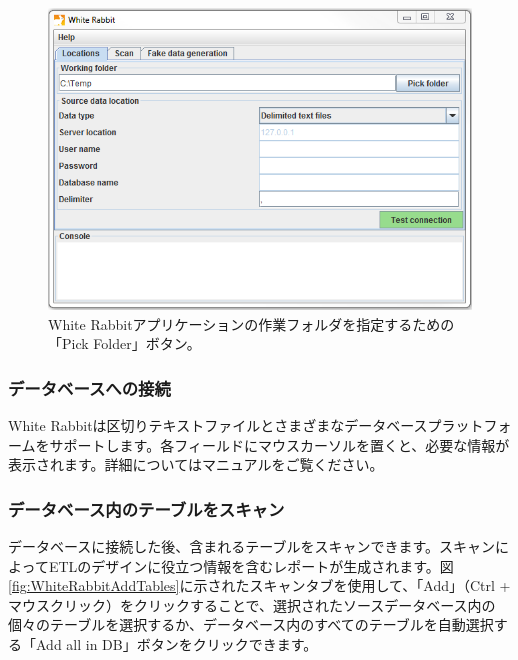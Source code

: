 \documentclass[
  11pt]{book}
\theoremstyle{definition}
\theoremstyle{definition}
\theoremstyle{definition}
\theoremstyle{definition}
\theoremstyle{remark}
\begin{document}
\begin{figure}

{\centering \includegraphics[width=1\linewidth]{images/ExtractTransformLoad/WhiteRabbitLocation} 

}

\caption{White Rabbitアプリケーションの作業フォルダを指定するための「Pick Folder」ボタン。}\label{fig:WhiteRabbitLocation}
\end{figure}

\subsubsection*{データベースへの接続}\label{ux30c7ux30fcux30bfux30d9ux30fcux30b9ux3078ux306eux63a5ux7d9a}

White Rabbitは区切りテキストファイルとさまざまなデータベースプラットフォームをサポートします。各フィールドにマウスカーソルを置くと、必要な情報が表示されます。詳細についてはマニュアルをご覧ください。

\subsubsection*{データベース内のテーブルをスキャン}\label{ux30c7ux30fcux30bfux30d9ux30fcux30b9ux5185ux306eux30c6ux30fcux30d6ux30ebux3092ux30b9ux30adux30e3ux30f3}

データベースに接続した後、含まれるテーブルをスキャンできます。スキャンによってETLのデザインに役立つ情報を含むレポートが生成されます。図\ref{fig:WhiteRabbitAddTables}に示されたスキャンタブを使用して、「Add」（Ctrl + マウスクリック）をクリックすることで、選択されたソースデータベース内の個々のテーブルを選択するか、データベース内のすべてのテーブルを自動選択する「Add all in DB」ボタンをクリックできます。
\end{document}
